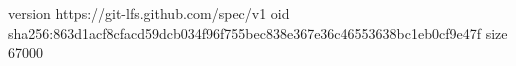 version https://git-lfs.github.com/spec/v1
oid sha256:863d1acf8cfacd59dcb034f96f755bec838e367e36c46553638bc1eb0cf9e47f
size 67000

